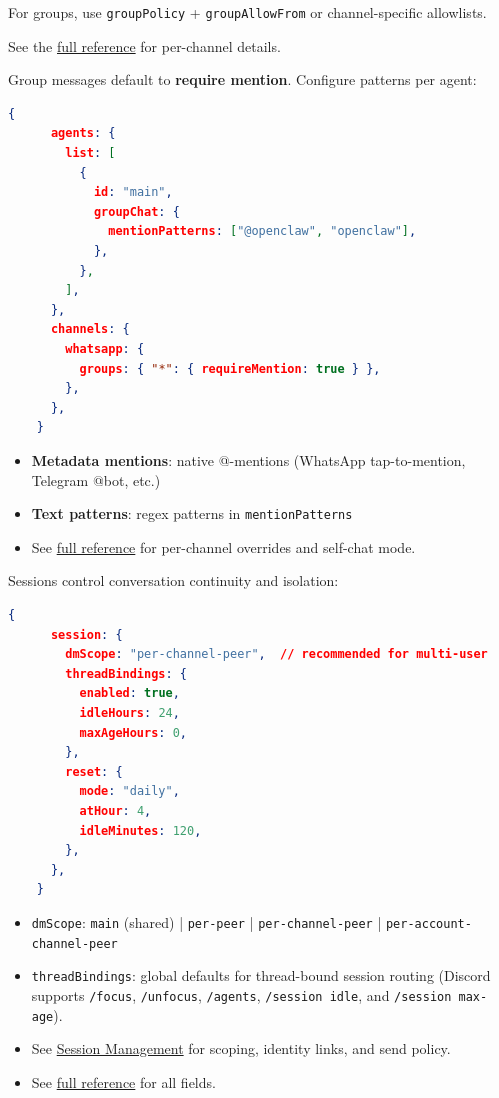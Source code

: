 For groups, use \texttt{groupPolicy} + \texttt{groupAllowFrom} or channel-specific allowlists.

See the \href{/gateway/configuration-reference\#dm-and-group-access}{full reference} for per-channel details.


Group messages default to \textbf{require mention}. Configure patterns per agent:

\begin{lstlisting}[language=json]
    {
      agents: {
        list: [
          {
            id: "main",
            groupChat: {
              mentionPatterns: ["@openclaw", "openclaw"],
            },
          },
        ],
      },
      channels: {
        whatsapp: {
          groups: { "*": { requireMention: true } },
        },
      },
    }
\end{lstlisting}


\begin{itemize}
  \item \textbf{Metadata mentions}: native @-mentions (WhatsApp tap-to-mention, Telegram @bot, etc.)
  \item \textbf{Text patterns}: regex patterns in \texttt{mentionPatterns}
  \item See \href{/gateway/configuration-reference\#group-chat-mention-gating}{full reference} for per-channel overrides and self-chat mode.
\end{itemize}



Sessions control conversation continuity and isolation:

\begin{lstlisting}[language=json]
    {
      session: {
        dmScope: "per-channel-peer",  // recommended for multi-user
        threadBindings: {
          enabled: true,
          idleHours: 24,
          maxAgeHours: 0,
        },
        reset: {
          mode: "daily",
          atHour: 4,
          idleMinutes: 120,
        },
      },
    }
\end{lstlisting}


\begin{itemize}
  \item \texttt{dmScope}: \texttt{main} (shared) | \texttt{per-peer} | \texttt{per-channel-peer} | \texttt{per-account-channel-peer}
  \item \texttt{threadBindings}: global defaults for thread-bound session routing (Discord supports \texttt{/focus}, \texttt{/unfocus}, \texttt{/agents}, \texttt{/session idle}, and \texttt{/session max-age}).
  \item See \href{/concepts/session}{Session Management} for scoping, identity links, and send policy.
  \item See \href{/gateway/configuration-reference\#session}{full reference} for all fields.
\end{itemize}




